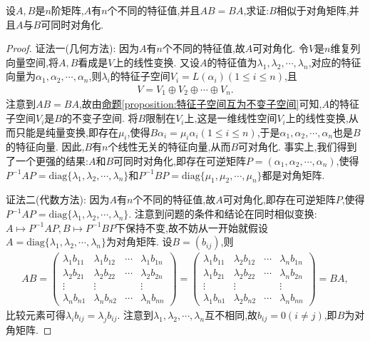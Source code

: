 \documentclass[../../main.tex]{subfiles}%
\begin{document}
\begin{proposition}\label{proposition:可对角化矩阵与其他矩阵乘法可交换诱导可同时对角化}
设$A,B$是$n$阶矩阵,$A$有$n$个不同的特征值,并且$AB = BA$,求证:$B$相似于对角矩阵,并且$A$与$B$可同时对角化.
\end{proposition}
\begin{proof}

{\color{blue}证法一(几何方法):} 因为$A$有$n$个不同的特征值,故$A$可对角化. 令$V$是$n$维复列向量空间,将$A,B$看成是$V$上的线性变换. 又设$A$的特征值为$\lambda_1,\lambda_2,\cdots,\lambda_n$,对应的特征向量为$\alpha_1,\alpha_2,\cdots,\alpha_n$,则$\lambda_i$的特征子空间$V_i = L(\alpha_i)(1 \leqslant  i \leqslant  n)$,且
\begin{align*}
V = V_1 \oplus V_2 \oplus \cdots \oplus V_n.
\end{align*}
注意到$AB = BA$,故由\hyperref[proposition:特征子空间互为不变子空间]{命题\ref{proposition:特征子空间互为不变子空间}}可知,$A$的特征子空间$V_i$是$B$的不变子空间. 将$B$限制在$V_i$上,这是一维线性空间$V_i$上的线性变换,从而只能是纯量变换,即存在$\mu_i$,使得$B\alpha_i = \mu_i\alpha_i(1 \leqslant  i \leqslant  n)$,于是$\alpha_1,\alpha_2,\cdots,\alpha_n$也是$B$的特征向量. 因此,$B$有$n$个线性无关的特征向量,从而$B$可对角化. 事实上,我们得到了一个更强的结果:$A$和$B$可同时对角化,即存在可逆矩阵$P = (\alpha_1,\alpha_2,\cdots,\alpha_n)$,使得$P^{-1}AP = \mathrm{diag}\{\lambda_1,\lambda_2,\cdots,\lambda_n\}$和$P^{-1}BP = \mathrm{diag}\{\mu_1,\mu_2,\cdots,\mu_n\}$都是对角矩阵.

{\color{blue}证法二(代数方法):}
 因为$A$有$n$个不同的特征值,故$A$可对角化,即存在可逆矩阵$P$,使得$P^{-1}AP = \mathrm{diag}\{\lambda_1,\lambda_2,\cdots,\lambda_n\}$. 注意到问题的条件和结论在同时相似变换:$A \mapsto P^{-1}AP,B \mapsto P^{-1}BP$下保持不变,故不妨从一开始就假设$A = \mathrm{diag}\{\lambda_1,\lambda_2,\cdots,\lambda_n\}$为对角矩阵. 设$B = (b_{ij})$,则
\begin{align*}
AB=\begin{pmatrix}
\lambda_1b_{11}&\lambda_1b_{12}&\cdots&\lambda_1b_{1n}\\
\lambda_2b_{21}&\lambda_2b_{22}&\cdots&\lambda_2b_{2n}\\
\vdots&\vdots&&\vdots\\
\lambda_nb_{n1}&\lambda_nb_{n2}&\cdots&\lambda_nb_{nn}
\end{pmatrix}=\begin{pmatrix}
\lambda_1b_{11}&\lambda_2b_{12}&\cdots&\lambda_nb_{1n}\\
\lambda_1b_{21}&\lambda_2b_{22}&\cdots&\lambda_nb_{2n}\\
\vdots&\vdots&&\vdots\\
\lambda_1b_{n1}&\lambda_2b_{n2}&\cdots&\lambda_nb_{nn}
\end{pmatrix}=BA,
\end{align*}
比较元素可得$\lambda_ib_{ij} = \lambda_jb_{ij}$. 注意到$\lambda_1,\lambda_2,\cdots,\lambda_n$互不相同,故$b_{ij} = 0(i \neq j)$,即$B$为对角矩阵.
\end{proof}
\end{document}
